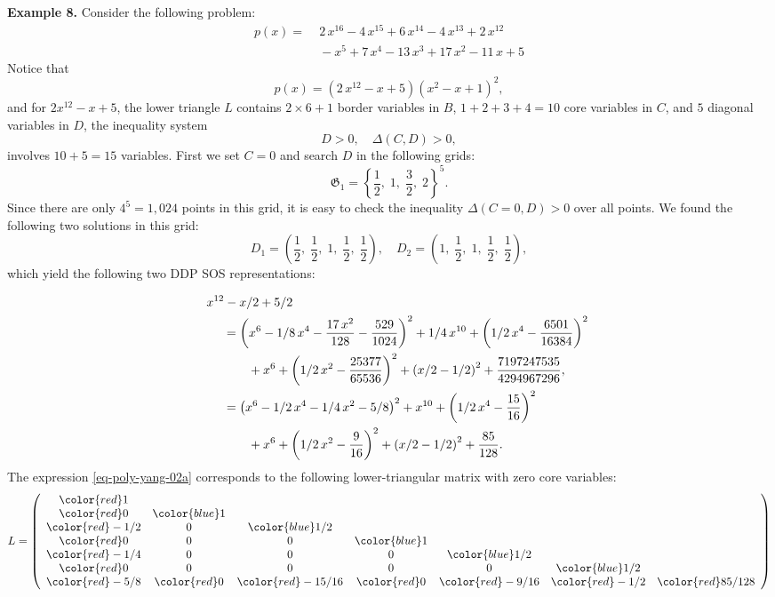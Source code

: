 \documentclass[runningheads]{llncs}
\newcommand{\Qo}{\Delta}
\begin{document}
{{\bf Example 8. } Consider the following problem:
\begin{align*}
p(x)=&\;2\,{x}^{16}-4\,{x}^{15}+6\,{x}^{14}-4\,{x}^{13}+2\,{x}^{12}\\
&\;-{x}^{5}+7
\,{x}^{4}-13\,{x}^{3}+17\,{x}^{2}-11\,x+5
\end{align*}
Notice that 
$$
p(x)=\left( 2\,{x}^{12}-x+5 \right)  \left( {x}^{2}-x+1 \right) ^{2},
$$
and for $2x^{12} - x + 5$,
the lower triangle $L$ contains $2\times 6+1$ border variables in $B$, $1+2+3+4=10$ core variables in $C$, and $5$ diagonal variables in $D$, the inequality system 
$$D>0,\quad  {\Qo}(C,D)>0,$$ 
involves $10+5=15$ variables. First we set $C=0$ and search $D$ in the following grids:
\[
{\mathfrak G}_1 = \left\{ \frac{1}{2},\; 1,\; \frac{3}{2},\; 2 \right\}^5.
\]
Since there are only $4^5=1,024$ points in this grid, it is easy to check the inequality ${\Qo}(C=0,D)>0$ over all points. We found the following two solutions in this grid:
\[
D_1 = \left( \frac{1}{2},\; \frac{1}{2},\; 1,\; \frac{1}{2},\; \frac{1}{2} \right), \quad
D_2 = \left( 1,\; \frac{1}{2},\; 1,\; \frac{1}{2},\; \frac{1}{2} \right),
\]
which yield the following two DDP SOS representations: 

\begin{align}
&
~~~~{x}^{12}-x/2+5/2\notag\\
&~~~~~~~~= \left( {x}^{6}-1/8\,{x}^{4}-{\frac {17\,{x}^{2}}{128
}}-{\frac{529}{1024}} \right) ^{2}+1/4\,{x}^{10}+ \left( 1/2\,{x}^{4}-
{\frac{6501}{16384}} \right) ^{2}\notag\\
&~~~~~~~~~~~~~~+{x}^{6}+ \left( 1/2\,{x}^{2}-{\frac{
25377}{65536}} \right) ^{2}+ \left( x/2-1/2 \right) ^{2}+{\frac{
7197247535}{4294967296}},\label{eq-poly-yang-01}
\\
&~~~~~~~~= \left( {x}^{6}-1/2\,{x}^{4}-1/4\,{x}^{2}-5/8
 \right) ^{2}+{x}^{10}+ \left( 1/2\,{x}^{4}-{\frac{15}{16}}
 \right) ^{2}\notag\\
 &~~~~~~~~~~~~~~+{x}^{6}+ \left( 1/2\,{x}^{2}-{\frac{9}{16}}
 \right) ^{2}+ \left( x/2-1/2 \right) ^{2}+{\frac{85}{128}}.\label{eq-poly-yang-02a}
\end{align}
The expression \eqref{eq-poly-yang-02a} corresponds to the following lower-triangular matrix with zero core variables:
$$
L=\left(\begin{array}{ccccccc}
{\color{red}1}&&&&&&\\
{\color{red}0}&{\color{blue}1}&&&&\\
{\color{red}-1/2}&0&{\color{blue}1/2}&&&\\
{\color{red}0}&0&0&{\color{blue}1}&&\\
{\color{red}-1/4}&0&0&0&{\color{blue}1/2}&&\\
{\color{red}0}&0&0&0&0&{\color{blue}1/2}&\\
{\color{red}-5/8}&{\color{red}0}&{\color{red}-15/16}&{\color{red}0}&{\color{red}-9/16}&{\color{red}-1/2}&{\color{red}85/128}
\end{array}\right)
$$

}
\end{document}
